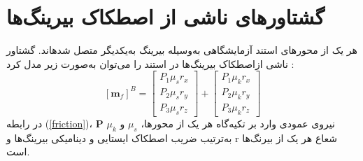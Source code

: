 \section{گشتاورهای ناشی از اصطكاک بیرينگ‌ها}
هر یک از محورهای استند آزمایشگاهی به‌وسیله بیرینگ به‌یکدیگر متصل شدهاند. گشتاور ناشی ازاصطکاک بیرینگ‌ها در استند را می‌توان به‌صورت زیر مدل کرد
\cite{Arabolye}
:
\begin{equation}\label{friction}
	[\boldsymbol m_f]^B = \begin{bmatrix}
		P_1\mu_sr_x \\
		P_2\mu_sr_y \\
		P_3\mu_sr_z
	\end{bmatrix} + \begin{bmatrix}
	P_1\mu_kr_x \\
	P_2\mu_kr_y \\
	P_3\mu_kr_z
\end{bmatrix}
\end{equation}
در رابطه
(\ref{friction})، $\boldsymbol P$ نیروی عمودی وارد بر تکیه‌گاه هر یک از محورها، $\mu_s$ و $\mu_k$ به‌ترتیب ضریب اصطکاک
ایستایی و دینامیکی بیرینگ‌ها و r شعاع هر یک از بیرنگ‌ها است.
